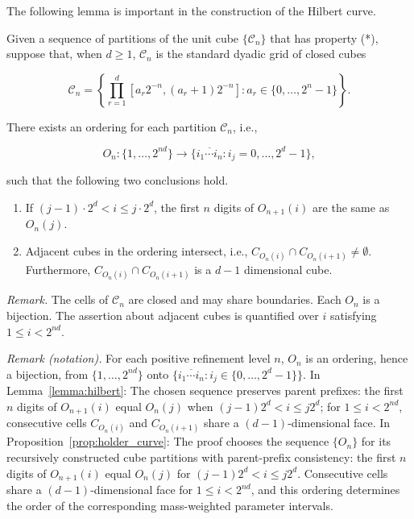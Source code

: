 The following lemma is important in the construction of the Hilbert curve.
\begin{lemma} \label{lemma:hilbert}
Given a sequence of partitions of the unit cube $\{\mathcal C_n\}$ that has property (*), suppose that, when $d\geqslant1$, $\mathcal C_n$ is the standard dyadic grid of closed cubes

\[
\mathcal C_n=\left\{\prod_{r=1}^d[a_r2^{-n},(a_r+1)2^{-n}]:a_r\in\{0,\ldots,2^n-1\}\right\}.
\]

There exists an ordering for each partition $\mathcal C_n$, i.e.,

\[
O_n:\{1,\ldots,2^{nd}\}\longrightarrow\{\overline{i_1\cdots i_n}:i_j=0,\ldots,2^d-1\},
\]

such that the following two conclusions hold.
    \begin{enumerate}
        \item If $ ( j-1) \cdotp 2^{d} < i\leqslant j\cdotp 2^{d}$, the first $ n$ digits of $ O_{n+1}( i)$ are the same as  $ O_{n}( j)$. 
        \item  Adjacent cubes in the ordering intersect, i.e., $ C_{O_{n}( i)} \cap C_{O_{n}( i+1)} \neq \emptyset $. Furthermore, $ C_{O_{n}( i)} \cap C_{O_{n}( i+1)}$ is a $d-1$ dimensional cube. 
    \end{enumerate}
\end{lemma}

\noindent\textit{Remark.} The cells of $\mathcal C_n$ are closed and may share boundaries. Each $O_n$ is a bijection. The assertion about adjacent cubes is quantified over $i$ satisfying $1\leqslant i<2^{nd}$.

\noindent\textit{Remark (notation).} For each positive refinement level $n$, $O_n$ is an ordering, hence a bijection, from $\{1,\ldots,2^{nd}\}$ onto $\{\overline{i_1\cdots i_n}:i_j\in\{0,\ldots,2^d-1\}\}$. In Lemma~\ref{lemma:hilbert}: The chosen sequence preserves parent prefixes: the first $n$ digits of $O_{n+1}(i)$ equal $O_n(j)$ when $(j-1)2^d<i\leqslant j2^d$; for $1\leqslant i<2^{nd}$, consecutive cells $C_{O_n(i)}$ and $C_{O_n(i+1)}$ share a $(d-1)$-dimensional face. In Proposition~\ref{prop:holder_curve}: The proof chooses the sequence $\{O_n\}$ for its recursively constructed cube partitions with parent-prefix consistency: the first $n$ digits of $O_{n+1}(i)$ equal $O_n(j)$ for $(j-1)2^d<i\leqslant j2^d$. Consecutive cells share a $(d-1)$-dimensional face for $1\leqslant i<2^{nd}$, and this ordering determines the order of the corresponding mass-weighted parameter intervals.

